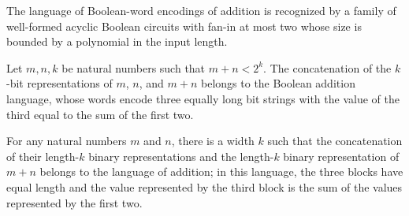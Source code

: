 \begin{theorem}
\label{Language.addition_inPPoly}
\leanok
{}
The language of Boolean-word encodings of addition is recognized by a family of
well-formed acyclic Boolean circuits with fan-in at most two whose size is bounded by a
polynomial in the input length.
\end{theorem}

\begin{theorem}
\label{Language.natToBits_mem_addition}
\leanok
{}
Let $m,n,k$ be natural numbers such that $m+n<2^k$. The concatenation of the $k$-bit
representations of $m$, $n$, and $m+n$ belongs to the Boolean addition language, whose
words encode three equally long bit strings with the value of the third equal to the sum
of the first two.
\end{theorem}

\begin{theorem}
\label{Language.exists_natToBits_mem_addition}
\leanok
{}
For any natural numbers $m$ and $n$, there is a width $k$ such that the concatenation of
their length-$k$ binary representations and the length-$k$ binary representation of
$m+n$ belongs to the language of addition; in this language, the three blocks have equal
length and the value represented by the third block is the sum of the values represented
by the first two.
\end{theorem}
